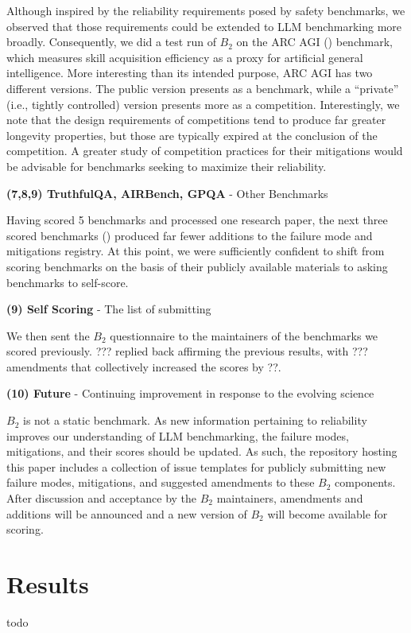 \documentclass{article}
\newcommand\bb{$B_2$ }
\begin{document}
Although inspired by the reliability requirements posed by safety benchmarks, we observed that those requirements could be extended to LLM benchmarking more broadly. Consequently, we did a test run of \bb on the ARC AGI (\cite{chollet2024arc}) benchmark, which measures skill acquisition efficiency as a proxy for artificial general intelligence. More interesting than its intended purpose, ARC AGI has two different versions. The public version presents as a benchmark, while a ``private'' (i.e., tightly controlled) version presents more as a competition. Interestingly, we note that the design requirements of competitions tend to produce far greater longevity properties, but those are typically expired at the conclusion of the competition. A greater study of competition practices for their mitigations would be advisable for benchmarks seeking to maximize their reliability.

\textbf{(7,8,9) TruthfulQA, AIRBench, GPQA} - Other Benchmarks

Having scored 5 benchmarks and processed one research paper, the next three scored benchmarks (\cite{lin2021truthfulqa,zeng2024air,rein2023gpqa}) produced far fewer additions to the failure mode and mitigations registry. At this point, we were sufficiently confident to shift from scoring benchmarks on the basis of their publicly available materials to asking benchmarks to self-score.

\textbf{(9) Self Scoring} - The list of submitting

We then sent the \bb questionnaire to the maintainers of the benchmarks we scored previously. ??? replied back affirming the previous results, with ??? amendments that collectively increased the scores by ??.

\textbf{(10) Future} - Continuing improvement in response to the evolving science

\bb is not a static benchmark. As new information pertaining to reliability improves our understanding of LLM benchmarking, the failure modes, mitigations, and their scores should be updated. As such, the repository hosting this paper includes a collection of issue templates for publicly submitting new failure modes, mitigations, and suggested amendments to these \bb components. After discussion and acceptance by the \bb maintainers, amendments and additions will be announced and a new version of \bb will become available for scoring.

\section{Results}
todo
\end{document}
